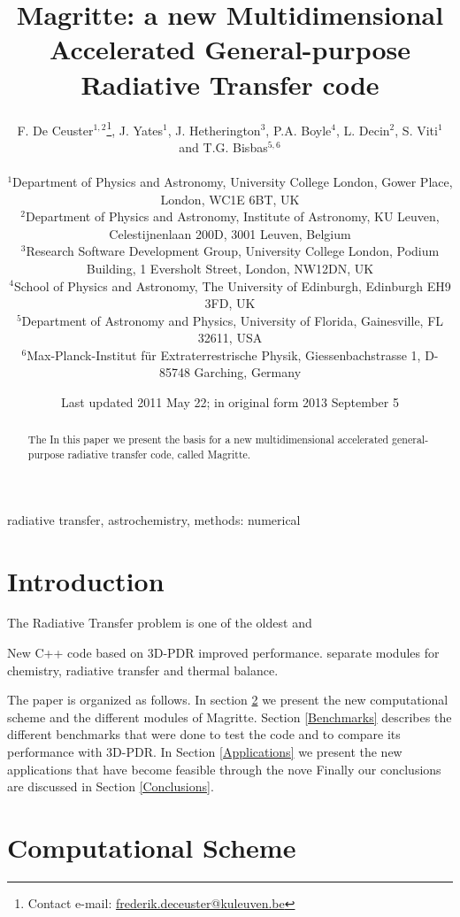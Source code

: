 \documentclass[a4paper,fleqn,usenatbib]{mnras}
\title[Magritte]{Magritte: a new Multidimensional Accelerated General-purpose Radiative Transfer code}
\author[F. De Ceuster]{ F. De Ceuster$^{1,2}$\thanks{Contact e-mail: \href{frederik.deceuster@kuleuven.be}{frederik.deceuster@kuleuven.be}}, J. Yates$^{1}$, J. Hetherington$^{3}$, P.A. Boyle$^{4}$, L. Decin$^{2}$, S. Viti$^{1}$ and T.G. Bisbas$^{5,6}$
\\ \\
$^{1}$Department of Physics and Astronomy, University College London, Gower Place, London, WC1E 6BT, UK \\
$^{2}$Department of Physics and Astronomy, Institute of Astronomy, KU Leuven, Celestijnenlaan 200D, 3001 Leuven, Belgium \\
$^{3}$Research Software Development Group, University College London, Podium Building, 1 Eversholt Street, London, NW12DN, UK \\
$^{4}$School of Physics and Astronomy, The University of Edinburgh, Edinburgh EH9 3FD, UK \\
$^{5}$Department of Astronomy and Physics, University of Florida, Gainesville, FL 32611, USA \\
$^{6}$Max-Planck-Institut f\"ur Extraterrestrische Physik, Giessenbachstrasse 1, D-85748 Garching, Germany}
\date{Last updated 2011 May 22; in original form 2013 September 5}
\begin{document}
\label{firstpage}
\pagerange{\pageref{firstpage}--\pageref{lastpage}}
\maketitle

\begin{abstract}
The  In this paper we present the basis for a new multidimensional accelerated general-purpose radiative transfer code, called Magritte.
\end{abstract}

\begin{keywords}
radiative transfer, astrochemistry, methods: numerical
\end{keywords}



\begingroup
\let\clearpage\relax
\endgroup
\newpage


\section{Introduction}

The Radiative Transfer problem is one of the oldest and

New C++ code based on 3D-PDR \citet{Bisbas2012} improved performance. separate modules for chemistry, radiative transfer and thermal balance.

The paper is organized as follows. In section \ref{CompSc} we present the new computational scheme and the different modules of Magritte. Section \ref{Benchmarks} describes the different benchmarks that were done to test the code and to compare its performance with 3D-PDR. In Section \ref{Applications} we present the new applications that have become feasible through the nove Finally our conclusions are discussed in Section \ref{Conclusions}.


\section{Computational Scheme}
\label{CompSc}
\end{document}
